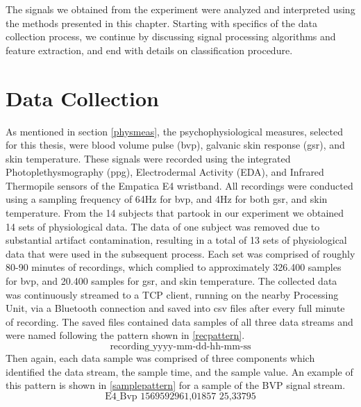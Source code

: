 The signals we obtained from the experiment were analyzed and interpreted using the methods presented in this chapter. Starting with specifics of the data collection process, we continue by discussing signal processing algorithms and feature extraction, and end with details on classification procedure.

\section{Data Collection}
As mentioned in section \ref{physmeas}, the psychophysiological measures, selected for this thesis, were blood volume pulse (\gls{bvp}), galvanic skin response (\gls{gsr}), and skin temperature. These signals were recorded using the integrated Photoplethysmography (\gls{ppg}), Electrodermal Activity (EDA), and Infrared Thermopile sensors of the Empatica E4 wristband. All recordings were conducted using a sampling frequency of 64Hz for \gls{bvp}, and 4Hz for both \gls{gsr}, and skin temperature. 
From the 14 subjects that partook in our experiment we obtained 14 sets of physiological data. The data of one subject was removed due to substantial artifact contamination, resulting in a total of 13 sets of physiological data that were used in the subsequent process. Each set was comprised of roughly 80-90 minutes of recordings, which complied to approximately 326.400 samples for \gls{bvp}, and 20.400 samples for \gls{gsr}, and skin temperature. 
The collected data was continuously streamed to a TCP client, running on the nearby Processing Unit, via a Bluetooth connection and saved into csv files after every full minute of recording. The saved files contained data samples of all three data streams and were named following the pattern shown in \ref{recpattern}.
\begin{equation} \label{recpattern}
\text{recording\_yyyy-mm-dd-hh-mm-ss}
\end{equation}
Then again, each data sample was comprised of three components which identified the data stream, the sample time, and the sample value. An example of this pattern is shown in \ref{samplepattern} for a sample of the BVP signal stream. 
\begin{equation}\label{samplepattern}
\text{E4\_Bvp 1569592961,01857 25,33795}
\end{equation}

